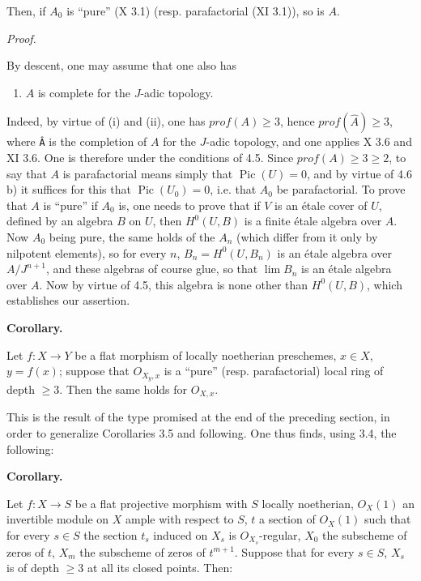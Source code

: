 \documentclass[
]{article}
\providecommand{\tightlist}{%
  \setlength{\itemsep}{0pt}\setlength{\parskip}{0pt}}
\begin{document}
Then, if \(A_{0}\) is ``pure'' (X 3.1) (resp. parafactorial (XI 3.1)),
so is \(A\).

\emph{Proof.}

By descent, one may assume that one also has

\begin{enumerate}
\def\labelenumi{\arabic{enumi}.}
\tightlist
\item
  \(A\) is complete for the \(J\)-adic topology.
\end{enumerate}

Indeed, by virtue of (i) and (ii), one has \(prof(A) \geqslant 3\),
hence \(prof(\hat{A}) \geqslant 3\), where \texttt{Â} is the completion
of \(A\) for the \(J\)-adic topology, and one applies X 3.6 and XI 3.6.
One is therefore under the conditions of 4.5. Since
\(prof(A) \geqslant 3 \geqslant 2\), to say that \(A\) is parafactorial
means simply that \(\operatorname{Pic}(U) = 0\), and by virtue of 4.6 b)
it suffices for this that \(\operatorname{Pic}(U_{0}) = 0\), i.e. that
\(A_{0}\) be parafactorial. To prove that \(A\) is ``pure'' if \(A_{0}\)
is, one needs to prove that if \(V\) is an étale cover of \(U\), defined
by an algebra \(B\) on \(U\), then \(H^{0}(U, B)\) is a finite étale
algebra over \(A\). Now \(A_{0}\) being pure, the same holds of the
\(A_{n}\) (which differ from it only by nilpotent elements), so for
every \(n\), \(B_{n} = H^{0}(U, B_{n})\) is an étale algebra over
\(A/J^{n+1}\), and these algebras of course glue, so that \(\lim B_{n}\)
is an étale algebra over \(A\). Now by virtue of 4.5, this algebra is
none other than \(H^{0}(U, B)\), which establishes our assertion.

\textbf{Corollary.}

Let \(f: X \to Y\) be a flat morphism of locally noetherian preschemes,
\(x \in X\), \(y = f(x)\); suppose that \(O_{X_{y},x}\) is a ``pure''
(resp. parafactorial) local ring of depth \(\geqslant 3\). Then the same
holds for \(O_{X,x}\).

This is the result of the type promised at the end of the preceding
section, in order to generalize Corollaries 3.5 and following. One thus
finds, using 3.4, the following:

\textbf{Corollary.}

Let \(f: X \to S\) be a flat projective morphism with \(S\) locally
noetherian, \(O_{X}(1)\) an invertible module on \(X\) ample with
respect to \(S\), \(t\) a section of \(O_{X}(1)\) such that for every
\(s \in S\) the section \(t_{s}\) induced on \(X_{s}\) is
\(O_{X_{s}}\)-regular, \(X_{0}\) the subscheme of zeros of \(t\),
\(X_{m}\) the subscheme of zeros of \(t^{m+1}\). Suppose that for every
\(s \in S\), \(X_{s}\) is of depth \(\geqslant 3\) at all its closed
points. Then:
\end{document}
